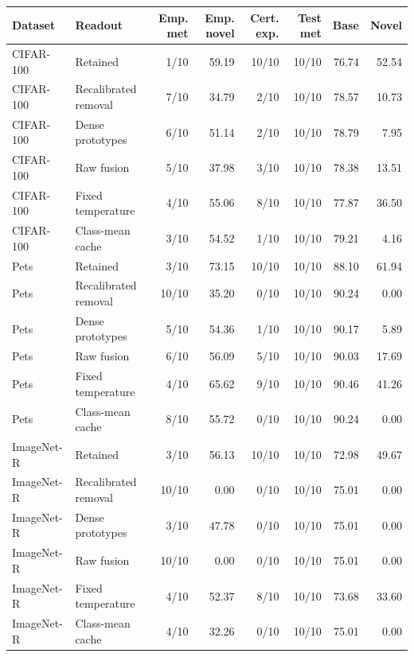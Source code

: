 \begin{tabular}{llrrrrrr}
\toprule
Dataset & Readout & Emp. met & Emp. novel & Cert. exp. & Test met & Base & Novel \\
\midrule
CIFAR-100 & Retained & 1/10 & 59.19 & 10/10 & 10/10 & 76.74 & 52.54 \\
CIFAR-100 & Recalibrated removal & 7/10 & 34.79 & 2/10 & 10/10 & 78.57 & 10.73 \\
CIFAR-100 & Dense prototypes & 6/10 & 51.14 & 2/10 & 10/10 & 78.79 & 7.95 \\
CIFAR-100 & Raw fusion & 5/10 & 37.98 & 3/10 & 10/10 & 78.38 & 13.51 \\
CIFAR-100 & Fixed temperature & 4/10 & 55.06 & 8/10 & 10/10 & 77.87 & 36.50 \\
CIFAR-100 & Class-mean cache & 3/10 & 54.52 & 1/10 & 10/10 & 79.21 & 4.16 \\
\midrule
Pets & Retained & 3/10 & 73.15 & 10/10 & 10/10 & 88.10 & 61.94 \\
Pets & Recalibrated removal & 10/10 & 35.20 & 0/10 & 10/10 & 90.24 & 0.00 \\
Pets & Dense prototypes & 5/10 & 54.36 & 1/10 & 10/10 & 90.17 & 5.89 \\
Pets & Raw fusion & 6/10 & 56.09 & 5/10 & 10/10 & 90.03 & 17.69 \\
Pets & Fixed temperature & 4/10 & 65.62 & 9/10 & 10/10 & 90.46 & 41.26 \\
Pets & Class-mean cache & 8/10 & 55.72 & 0/10 & 10/10 & 90.24 & 0.00 \\
\midrule
ImageNet-R & Retained & 3/10 & 56.13 & 10/10 & 10/10 & 72.98 & 49.67 \\
ImageNet-R & Recalibrated removal & 10/10 & 0.00 & 0/10 & 10/10 & 75.01 & 0.00 \\
ImageNet-R & Dense prototypes & 3/10 & 47.78 & 0/10 & 10/10 & 75.01 & 0.00 \\
ImageNet-R & Raw fusion & 10/10 & 0.00 & 0/10 & 10/10 & 75.01 & 0.00 \\
ImageNet-R & Fixed temperature & 4/10 & 52.37 & 8/10 & 10/10 & 73.68 & 33.60 \\
ImageNet-R & Class-mean cache & 4/10 & 32.26 & 0/10 & 10/10 & 75.01 & 0.00 \\
\bottomrule
\end{tabular}
